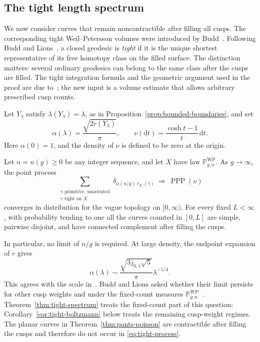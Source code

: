 \subsection{The tight length spectrum}\label{subsec:tight-spectrum}

We now consider curves that remain noncontractible after filling all
cusps. The corresponding tight Weil--Petersson volumes were introduced
by Budd~\cite{Budd}. Following Budd and Lions~\cite{BL}, a closed geodesic is
\emph{tight} if it is the unique shortest representative of its free
homotopy class on the filled surface. The distinction matters: several
ordinary geodesics can belong to the same class after the cusps are
filled. The tight integration formula and the geometric argument used
in the proof are due to~\cite{BL}; the new input is a volume estimate that
allows arbitrary prescribed cusp counts.

Let $Y_\lambda$ satisfy $\lambda(Y_\lambda)=\lambda$,
as in Proposition~\ref{prop:bounded-boundaries}, and set
\begin{equation}
 \alpha(\lambda)=\frac{\sqrt{2r(Y_\lambda)}}\pi,
 \qquad \nu(\mathrm dt)=\frac{\cosh t-1}{t}\,\mathrm dt.
 \label{eq:tight-scale}
\end{equation}
Here $\alpha(0)=1$, and the density of $\nu$ is defined to be zero
at the origin.

\begin{theorem}
\label{thm:tight-spectrum}
Let $n=n(g)\ge0$ be any integer sequence, and let $X$ have law
$\mathbb P^{\mathrm{WP}}_{g,n}$. As $g\to\infty$, the point process
\begin{equation}
 \sum_{\substack{\gamma\text{ primitive, unoriented}\\
                  \gamma\text{ tight on }X}}
 \delta_{\alpha(n/g)\ell_X(\gamma)}
 \ \Longrightarrow\ \operatorname{PPP}(\nu)
 \label{eq:tight-process}
\end{equation}
converges in distribution for the vague topology on $[0,\infty)$.
For every fixed $L<\infty$, with probability tending to one all the
curves counted in $[0,L]$ are simple, pairwise disjoint, and have
connected complement after filling the cusps.
\end{theorem}

In particular, no limit of $n/g$ is required. At large density,
the endpoint expansion of $r$ gives
\[
 \alpha(\lambda)\sim
 \frac{\sqrt{3j_{0,1}\sqrt5}}\pi\lambda^{-1/4}.
\]
This agrees with the scale in~\cite[Corollary~1.3]{BL}.
Budd and Lions asked whether their limit persists for other cusp
weights and under the fixed-count measures
$\mathbb P^{\mathrm{WP}}_{g,n}$~\cite[Open Question~1.6]{BL}.
Theorem~\ref{thm:tight-spectrum} treats the fixed-count part of this
question; Corollary~\ref{cor:tight-boltzmann} below treats the
remaining cusp-weight regimes. The planar curves in
Theorem~\ref{thm:pants-poisson} are contractible after filling the
cusps and therefore do not occur in \eqref{eq:tight-process}.

